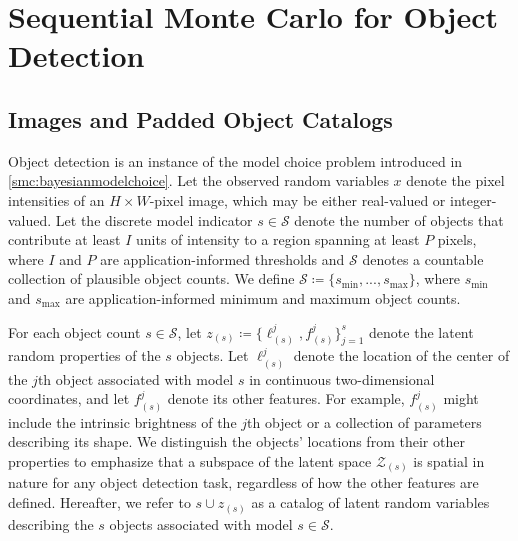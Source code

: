 \documentclass[
  12pt]{article}
\begin{document}



\section{Sequential Monte Carlo for Object Detection} \label{smc:smcforobjdet}

\subsection{Images and Padded Object Catalogs} \label{smc:imagesandcats}

Object detection is an instance of the model choice problem introduced in \autoref{smc:bayesianmodelchoice}. Let the observed random variables $x$ denote the pixel intensities of an $H{\times}W$-pixel image, which may be either real-valued or integer-valued. Let the discrete model indicator $s \in \mathcal{S}$ denote the number of objects that contribute at least $I$ units of intensity to a region spanning at least $P$ pixels, where $I$ and $P$ are application-informed thresholds and $\mathcal{S}$ denotes a countable collection of plausible object counts. We define $\mathcal{S} \coloneqq \{s_{\min},...,s_{\max}\}$, where $s_{\min}$ and $s_{\max}$ are application-informed minimum and maximum object counts.

For each object count $s \in \mathcal{S}$, let $z_{(s)} \coloneqq \{\ell_{(s)}^j, f_{(s)}^j\}_{j=1}^s$ denote the latent random properties of the $s$ objects. Let $\ell_{(s)}^j$ denote the location of the center of the $j$th object associated with model $s$ in continuous two-dimensional coordinates, and let $f_{(s)}^j$ denote its other features. For example, $f_{(s)}^j$ might include the intrinsic brightness of the $j$th object or a collection of parameters describing its shape. We distinguish the objects' locations from their other properties to emphasize that a subspace of the latent space $\mathcal{Z}_{(s)}$ is spatial in nature for any object detection task, regardless of how the other features are defined. Hereafter, we refer to $s \cup z_{(s)}$ as a catalog of latent random variables describing the $s$ objects associated with model $s \in \mathcal{S}$.
\end{document}
